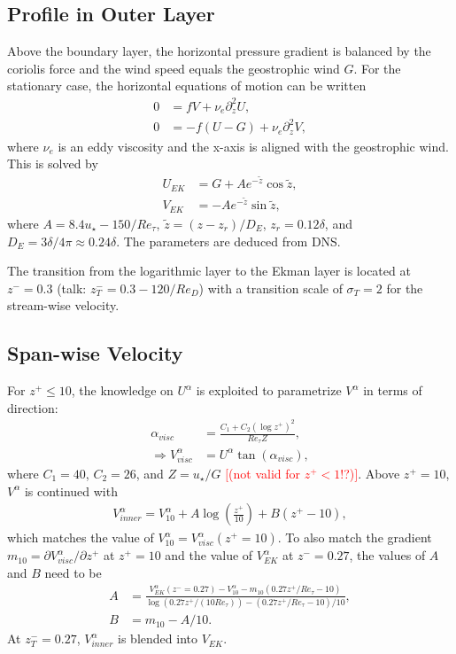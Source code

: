 \documentclass[a4paper,11pt]{article}
\newcommand{\todo}[1]{\textcolor{red}{$[$#1$]$}}
\begin{document}
\subsection{Profile in Outer Layer}

Above the boundary layer, the horizontal pressure gradient is balanced by the coriolis force and the wind speed equals the geostrophic wind $G$. For the stationary case, the horizontal equations of motion can be written
\begin{subequations}
  \begin{align}
    0&=fV+\nu_e\partial_z^2U,\\
		0&=-f(U-G)+\nu_e\partial_z^2V,
  \end{align}
\end{subequations}
where $\nu_e$ is an eddy viscosity and the x-axis is aligned with the geostrophic wind. This is solved by
\begin{subequations}
  \begin{align}
    U_{EK} &= G + Ae^{-\tilde{z}}\cos\tilde{z},\\
		V_{EK} &= - Ae^{-\tilde{z}}\sin\tilde{z},
  \end{align}
\end{subequations}
where $A = 8.4u_\star - 150/Re_\tau$, $\tilde{z} = (z-z_r)/D_E$, $z_r = 0.12\delta$, and $D_E = 3\delta/4\pi\approx 0.24\delta$. The parameters are deduced from DNS.

The transition from the logarithmic layer to the Ekman layer is located at $z^-=0.3$ (talk: $z^-_T=0.3-120/Re_D$) with a transition scale of $\sigma_T=2$ for the stream-wise velocity.

\subsection{Span-wise Velocity}

For $z^+\leq10$, the knowledge on $U^\alpha$ is exploited to parametrize $V^\alpha$ in terms of direction:
\begin{align}
  \alpha_{visc} &= \frac{C_1+C_2(\log  z^+)^2}{Re_\tau Z},\\
	\Rightarrow V_{visc}^\alpha &= U^\alpha\tan(\alpha_{visc}),
\end{align}
where $C_1=40$, $C_2=26$, and $Z=u_\star/G$ \todo{(not valid for $z^+<1$!?)}. Above $z^+=10$, $V^\alpha$ is continued with
\begin{align}
  V_{inner}^\alpha = V_{10}^\alpha + A\log\left(\frac{z^+}{10}\right) + B(z^+-10),
\end{align}
which matches the value of $V_{10}^\alpha = V^\alpha_{visc}(z^+=10)$. To also match the gradient $m_{10}=\partial V_{visc}^\alpha/\partial z^+$ at $z^+=10$ and the value of $V_{EK}^\alpha$ at $z^-=0.27$, the values of $A$ and $B$ need to be
\begin{align}
  A &= \frac{V_{EK}^\alpha(z^-=0.27)-V_{10}^\alpha-m_{10}\left(0.27z^+/Re_{\tau}-10\right)}{\log(0.27z^+/(10Re_{\tau}))-(0.27z^+/Re_{\tau}-10)/10},\\
	B &= m_{10}-A/10.
\end{align}
At $z_T^-=0.27$, $V_{inner}^\alpha$ is blended into $V_{EK}$.
\end{document}
